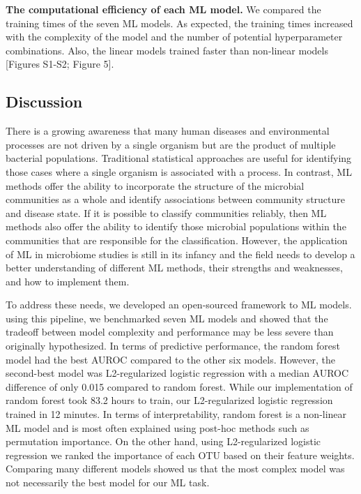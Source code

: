 \documentclass[11pt,]{article}
\begin{document}
\textbf{The computational efficiency of each ML model.} We compared the
training times of the seven ML models. As expected, the training times
increased with the complexity of the model and the number of potential
hyperparameter combinations. Also, the linear models trained faster than
non-linear models {[}Figures S1-S2; Figure 5{]}.

\subsection{Discussion}\label{discussion}

There is a growing awareness that many human diseases and environmental
processes are not driven by a single organism but are the product of
multiple bacterial populations. Traditional statistical approaches are
useful for identifying those cases where a single organism is associated
with a process. In contrast, ML methods offer the ability to incorporate
the structure of the microbial communities as a whole and identify
associations between community structure and disease state. If it is
possible to classify communities reliably, then ML methods also offer
the ability to identify those microbial populations within the
communities that are responsible for the classification. However, the
application of ML in microbiome studies is still in its infancy and the
field needs to develop a better understanding of different ML methods,
their strengths and weaknesses, and how to implement them.

To address these needs, we developed an open-sourced framework to ML
models. using this pipeline, we benchmarked seven ML models and showed
that the tradeoff between model complexity and performance may be less
severe than originally hypothesized. In terms of predictive performance,
the random forest model had the best AUROC compared to the other six
models. However, the second-best model was L2-regularized logistic
regression with a median AUROC difference of only 0.015 compared to
random forest. While our implementation of random forest took 83.2 hours
to train, our L2-regularized logistic regression trained in 12 minutes.
In terms of interpretability, random forest is a non-linear ML model and
is most often explained using post-hoc methods such as permutation
importance. On the other hand, using L2-regularized logistic regression
we ranked the importance of each OTU based on their feature weights.
Comparing many different models showed us that the most complex model
was not necessarily the best model for our ML task.
\end{document}
